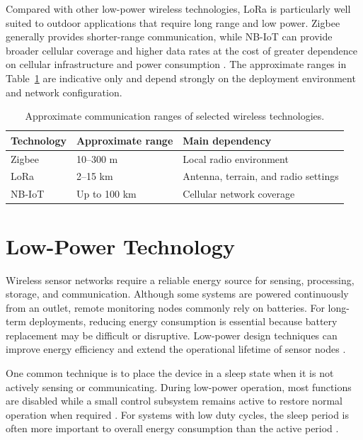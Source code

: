 Compared with other low-power wireless technologies, LoRa is particularly
well suited to outdoor applications that require long range and low power.
Zigbee generally provides shorter-range communication, while NB-IoT can
provide broader cellular coverage and higher data rates at the cost of
greater dependence on cellular infrastructure and power consumption
\cite{liu2023zigbee,danladi2022lpwan}. The approximate ranges in
Table~\ref{tab:wireless-range-comparison} are indicative only and depend
strongly on the deployment environment and network configuration.

\begin{table}[htbp]
\centering
\caption{Approximate communication ranges of selected wireless technologies.}
\label{tab:wireless-range-comparison}
\begin{tabular}{lll}
\toprule
\textbf{Technology} & \textbf{Approximate range} & \textbf{Main dependency} \\
\midrule
Zigbee & 10--300 m & Local radio environment \\
LoRa & 2--15 km & Antenna, terrain, and radio settings \\
NB-IoT & Up to 100 km & Cellular network coverage \\
\bottomrule
\end{tabular}
\end{table}

\section{Low-Power Technology}

Wireless sensor networks require a reliable energy source for sensing,
processing, storage, and communication. Although some systems are powered
continuously from an outlet, remote monitoring nodes commonly rely on
batteries. For long-term deployments, reducing energy consumption is
essential because battery replacement may be difficult or disruptive.
Low-power design techniques can improve energy efficiency and extend the
operational lifetime of sensor nodes \cite{lahiri2002battery}.

One common technique is to place the device in a sleep state when it is
not actively sensing or communicating. During low-power operation, most
functions are disabled while a small control subsystem remains active to
restore normal operation when required \cite{zhang2023sleep}. For systems
with low duty cycles, the sleep period is often more important to overall
energy consumption than the active period \cite{hwang2012poweraware}.


